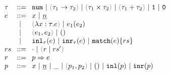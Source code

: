 \begin{figure}[h]
$\arraycolsep=4pt\begin{array}{lll}
\tau & ::= &
  \tnum ~\vert~
  \tarr{\tau_1}{\tau_2} ~\vert~
  \tprod{\tau_1}{\tau_2} ~\vert~
  \tsum{\tau_1}{\tau_2} ~\vert~
  \tunit ~\vert~
  \tvoid \\
e & ::= &
  x ~\vert~
  \hnum{n} \\
  & ~\vert~ &
  \hlam{x}{\tau}{e} ~\vert~
  \hap{e_1}{e_2} \\
  & ~\vert~ &
  \hpair{e_1}{e_2} ~\vert~
  \htriv \\
  & ~\vert~ &
  \hinl{\tau}{e} ~\vert~
  \hinr{\tau}{e} ~\vert~
  \hmatch{e}{rs} \\
rs & ::= &
  \cdot ~\vert~ \hrules{r}{rs'} \\
r & ::= &
  \hrul{p}{e} \\
p & ::= &
  x ~\vert~
  \hnum{n} ~\vert~
  \_ ~\vert~
  \hpair{p_1}{p_2} ~\vert~
  \htriv ~\vert~
  \hinlp{p} ~\vert~
  \hinrp{p}
\end{array}$
\end{figure}

